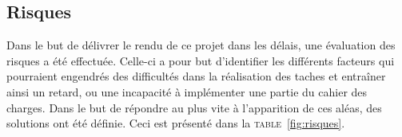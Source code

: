 

	\subsection{Risques}
		\label{subsec:risques}



    Dans le but de délivrer le rendu de ce projet dans les délais, une évaluation des risques a été effectuée. Celle-ci a pour but d'identifier les différents facteurs qui pourraient engendrés des difficultés dans la réalisation des taches et entraîner ainsi un retard, ou une incapacité à implémenter une partie du cahier des charges. Dans le but de répondre au plus vite à l’apparition de ces aléas, des solutions ont été définie. Ceci est présenté dans la \textsc{table}~\ref{fig:risques}.



